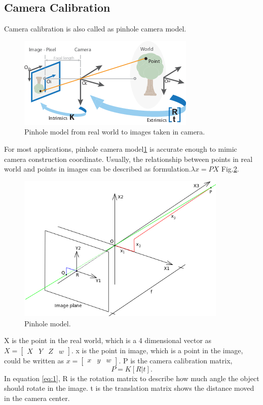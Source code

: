 \documentclass[senior]{IPSstyle}
\begin{document}
\subsection{Camera Calibration}
Camera calibration is also called as pinhole camera model.
\begin{figure}[H]
    \centering
    \includegraphics{MasterThesis-master/images/calibration_cameramodel_coords.png}
    \caption{Pinhole model from real world to images taken in camera.}
    \label{fig:pinhole_model}
\end{figure}
For most applications, pinhole camera model\ref{fig:pinhole_model} is accurate enough to mimic camera construction coordinate.
Usually, the relationship between points in real world and points in images can be described as formulation.$\lambda x = PX$ Fig.\ref{fig:pinhole_model_coordinate}.

\begin{figure}[h!]
    \centering
    \includegraphics[width=10cm]{MasterThesis-master/images/Pinhole.png}
    \caption{Pinhole model.}
    \label{fig:pinhole_model_coordinate}
\end{figure}

X is the point in the real world, which is a 4 dimensional vector as $X = \begin{bmatrix} X & Y & Z & w \end{bmatrix}$.
x is the point in image, which is a point in the image, could be written as $x = \begin{bmatrix} x & y & w \end{bmatrix}$.
P is the camera calibration matrix, 
\begin{equation}\label{eq:1}
    P=K[R|t].
\end{equation}
In equation \ref{eq:1}, R is the rotation matrix to describe how much angle the object should rotate in the image.
t is the translation matrix shows the distance moved in the camera center.
\end{document}
